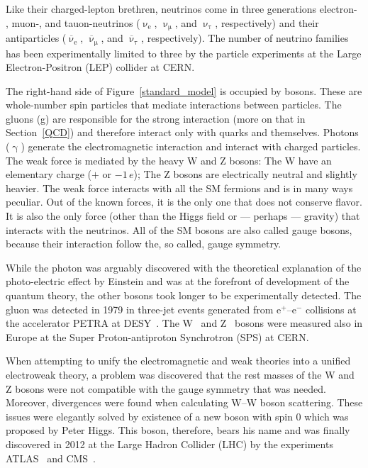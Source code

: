 Like their charged-lepton brethren, neutrinos come in three generations electron- , muon-, and tauon-neutrinos ($\upnu_\mathrm{e}$, $\upnu_\upmu$, and $\upnu_\uptau$, respectively) and their antiparticles ($\overline{\upnu}_\mathrm{e}$, $\overline{\upnu}_\upmu$, and $\overline{\upnu}_\uptau$, respectively). The number of neutrino families has been experimentally limited to three by the particle experiments at the Large Electron-Positron (LEP) collider at CERN\@.

The right-hand side of Figure~\ref{standard_model} is occupied by bosons. These are whole-number spin particles that mediate interactions between particles. The gluons (g) are responsible for the strong interaction (more on that in Section~\ref{QCD}) and therefore interact only with quarks and themselves. Photons ($\upgamma$) generate the electromagnetic interaction and interact with charged particles. The weak force is mediated by the heavy W and Z bosons: The W have an elementary charge ($+$ or $-1\,e$); The Z bosons are electrically neutral and slightly heavier. The weak force interacts with all the SM fermions and is in many ways peculiar. Out of the known forces, it is the only one that does not conserve flavor. It is also the only force (other than the Higgs field or --- perhaps --- gravity) that interacts with the neutrinos. All of the SM bosons are also called gauge bosons, because their interaction follow the, so called, gauge symmetry.

While the photon was arguably discovered with the theoretical explanation of the photo-electric effect by Einstein and was at the forefront of development of the quantum theory, the other bosons took longer to be experimentally detected. The gluon was detected in 1979 in three-jet events generated from e$^+$--e$^-$ collisions at the accelerator PETRA at DESY~\cite{gluons}\@. The W~\cite{WBosonUA1,WBosonUA2} and Z~\cite{ZDiscovery} bosons were measured also in Europe at the Super Proton-antiproton Synchrotron (SPS) at CERN\@.

When attempting to unify the electromagnetic and weak theories into a unified electroweak theory, a problem was discovered that the rest masses of the W and Z bosons were not compatible with the gauge symmetry that was needed. Moreover, divergences were found when calculating W--W boson scattering. These issues were elegantly solved by existence of a new boson with spin 0 which was proposed by Peter Higgs. This boson, therefore, bears his name and was finally discovered in 2012 at the Large Hadron Collider (LHC) by the experiments ATLAS~\cite{HiggsAtlas} and CMS~\cite{HiggsCMS}\@. 

